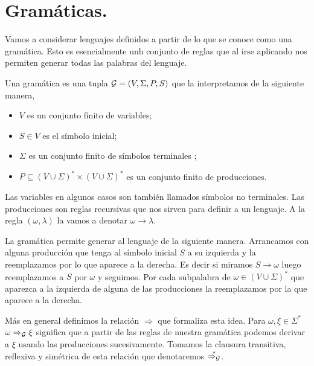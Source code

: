 \documentclass[tesis.tex]{subfiles}
\begin{document}
\begin{comment}
	\begin{obs}
	De esta manera podemos pensar a una {presentación} de un monoide $M$  como un epimorfismo de monoides $\pi: \Sigma^{*} \to M$. Esto nos dice que el monoide $M$ tiene como generadores a $\Sigma$ y sus relaciones están dadas por el núcleo del morfismo $\pi$.
	\end{obs}
\end{comment}
\section{Gramáticas.}
Vamos a considerar lenguajes definidos a partir de lo que se conoce como una gramática. Esto es esencialmente unh conjunto de reglas que al irse aplicando nos permiten generar todas las palabras del lenguaje.

\begin{deff}
	Una gramática es una tupla ${\cal G} = (V, \Sigma, P, S)$ que la interpretamos de la siguiente manera,
	\begin{itemize}
		\item $V$ es un conjunto finito de variables;
		\item $S \in V$ es el símbolo inicial;
		\item $\Sigma$ es un conjunto finito de símbolos terminales ;
		\item $P \subseteq (V \cup \Sigma)^* \times (V \cup \Sigma)^*$ es un conjunto finito de producciones.
	\end{itemize}
\end{deff}

Las variables en algunos casos son también llamados símbolos no terminales. Las producciones son reglas recursivas que nos sirven para definir a un lenguaje. A la regla $(\omega, \lambda)$ la vamos a denotar $\omega \to \lambda$.

La gramática permite generar al lenguaje de la siguiente manera. Arrancamos con alguna producción que tenga al símbolo inicial $S$ a su izquierda y la reemplazamos por lo que aparece a la derecha. Es decir si miramos $S \to \omega$ luego reemplazamos a $S$ por $\omega$ y seguimos. Por cada subpalabra de $\omega\in (V \cup \Sigma)^*$ que aparezca a la izquierda de alguna de las producciones la reemplazamos por la que aparece a la derecha. 

Más en general definimos la relación $\Rightarrow$ que formaliza esta idea. Para $\omega, \xi \in \Sigma^*$  $\omega \Rightarrow_{\cal G} \xi$ significa que a partir de las reglas de nuestra gramática podemos derivar a $\xi$ usando las producciones sucesivamente. Tomamos la clausura transitiva, reflexiva y simétrica de esta relación que denotaremos $\overset{*}{\Rightarrow_{\cal G}}$.
\end{document}
